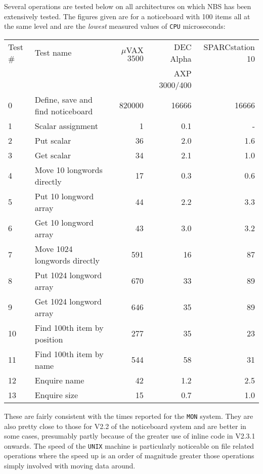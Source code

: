 Several operations are tested below on all architectures on which NBS has
been extensively tested. The
figures given are for a noticeboard with 100 items all at the same level and
are the {\em lowest} measured values of {\tt CPU} microseconds:

\begin{small}
\begin {center}
\begin {tabular}{||l|l|r|r|r||}
\hline
Test \# & Test name                     & $\mu$VAX $ 3500$  & 
DEC Alpha & SPARCstation 10 \\ 
& & & AXP 3000/400  & \\ \hline
0       & Define, save and find noticeboard & 820000    &  16666 & 16666 \\
1       & Scalar assignment             & 1         &    0.1     &   -   \\  
2       & Put scalar                    & 36        &    2.0     &   1.6 \\
3       & Get scalar                    & 34        &    2.1     &   1.0 \\
4       & Move 10 longwords directly    & 17        &    0.3     &   0.6 \\
5       & Put 10 longword array         & 44        &    2.2     &   3.3 \\
6       & Get 10 longword array         & 43        &    3.0     &   3.2 \\
7       & Move 1024 longwords directly  & 591       &     16     &   87 \\
8       & Put 1024 longword array       & 670       &     33     &   89 \\
9       & Get 1024 longword array       & 646       &     35     &   89 \\
10      & Find 100th item by position   & 277       &     35     &   23 \\
11      & Find 100th item by name       & 544       &     58     &   31 \\
12      & Enquire name                  & 42        &    1.2     &   2.5 \\
13      & Enquire size                  & 15        &    0.7     &   1.0 \\
\hline
\end {tabular}
\end {center}
\end{small}

These are fairly consistent with the times reported for the {\tt MON} system.
They are also pretty close to those for V2.2 of the noticeboard system and are
better in some cases, presumably partly because of the greater use of inline
code in V2.3.1 onwards. The speed of the {\tt UNIX} machine is particularly
noticeable on file related operations where the speed up is an order of
magnitude greater those operations simply involved with moving data around.

